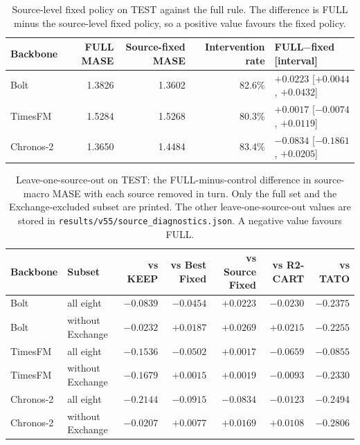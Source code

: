 \documentclass{article}
\begin{document}
\begin{table}[htbp]
\centering\small
\caption{Source-level fixed policy on TEST against the full rule. The difference is FULL
minus the source-level fixed policy, so a positive value favours the fixed policy.}
\label{tab:v53-source-fixed}
\begin{tabular*}{\textwidth}{@{\extracolsep{\fill}}lrrrl@{}}
\toprule
Backbone & FULL MASE & Source-fixed MASE & Intervention rate & FULL$-$fixed [interval] \\
\midrule
Bolt & 1.3826 & 1.3602 & 82.6\% & $+0.0223$ [$+0.0044$, $+0.0432$] \\
TimesFM & 1.5284 & 1.5268 & 80.3\% & $+0.0017$ [$-0.0074$, $+0.0119$] \\
Chronos-2 & 1.3650 & 1.4484 & 83.4\% & $-0.0834$ [$-0.1861$, $+0.0205$] \\
\bottomrule
\end{tabular*}
\end{table}

\begin{table}[htbp]
\centering\small
\caption{Leave-one-source-out on TEST: the FULL-minus-control difference in source-macro
MASE with each source removed in turn. Only the full set and the Exchange-excluded subset
are printed. The other leave-one-source-out values are stored in
\texttt{results/v55/source\_diagnostics.json}. A negative value favours FULL.}
\label{tab:v53-loso}
\begin{tabular*}{\textwidth}{@{\extracolsep{\fill}}llrrrrr@{}}
\toprule
Backbone & Subset & vs KEEP & vs Best Fixed & vs Source Fixed & vs R2-CART & vs TATO \\
\midrule
Bolt & all eight & $-0.0839$ & $-0.0454$ & $+0.0223$ & $-0.0230$ & $-0.2375$ \\
Bolt & without Exchange & $-0.0232$ & $+0.0187$ & $+0.0269$ & $+0.0215$ & $-0.2255$ \\
TimesFM & all eight & $-0.1536$ & $-0.0502$ & $+0.0017$ & $-0.0659$ & $-0.0855$ \\
TimesFM & without Exchange & $-0.1679$ & $+0.0015$ & $+0.0019$ & $-0.0093$ & $-0.2330$ \\
Chronos-2 & all eight & $-0.2144$ & $-0.0915$ & $-0.0834$ & $-0.0123$ & $-0.2494$ \\
Chronos-2 & without Exchange & $-0.0207$ & $+0.0077$ & $+0.0169$ & $+0.0108$ & $-0.2806$ \\
\bottomrule
\end{tabular*}
\end{table}
\end{document}

